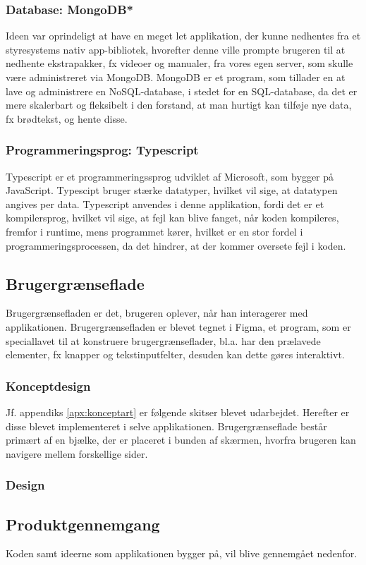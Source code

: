 \subsubsection{Database: MongoDB*}
Ideen var oprindeligt at have en meget let applikation, der kunne nedhentes fra et styresystems nativ app-bibliotek, hvorefter denne ville prompte brugeren til at nedhente ekstrapakker, fx videoer og manualer, fra vores egen server, som skulle være administreret via MongoDB. MongoDB er et program, som tillader en at lave og administrere en NoSQL-database, i stedet for en SQL-database, da det er mere skalerbart og fleksibelt i den forstand, at man hurtigt kan tilføje nye data, fx brødtekst, og hente disse. 
\subsubsection{Programmeringsprog: Typescript}
Typescript er et programmeringssprog udviklet af Microsoft, som bygger på JavaScript. Typescipt bruger stærke datatyper, hvilket vil sige, at datatypen angives per data. Typescript anvendes i denne applikation, fordi det er et kompilersprog, hvilket vil sige, at fejl kan blive fanget, når koden kompileres, fremfor i runtime, mens programmet kører, hvilket er en stor fordel i programmeringsprocessen, da det hindrer, at der kommer oversete fejl i koden.
\subsection{Brugergrænseflade}
Brugergrænsefladen er det, brugeren oplever, når han interagerer med applikationen. Brugergrænsefladen er blevet tegnet i Figma, et program, som er speciallavet til at konstruere brugergrænseflader, bl.a. har den prælavede elementer, fx knapper og tekstinputfelter, desuden kan dette gøres interaktivt. 
\subsubsection{Konceptdesign}
Jf. appendiks \ref{apx:konceptart} er følgende skitser blevet udarbejdet. Herefter er disse blevet implementeret i selve applikationen. Brugergrænseflade består primært af en bjælke, der er placeret i bunden af skærmen, hvorfra brugeren kan navigere mellem forskellige sider.
\subsubsection{Design}

\subsection{Produktgennemgang}
Koden samt ideerne som applikationen bygger på, vil blive gennemgået nedenfor.
